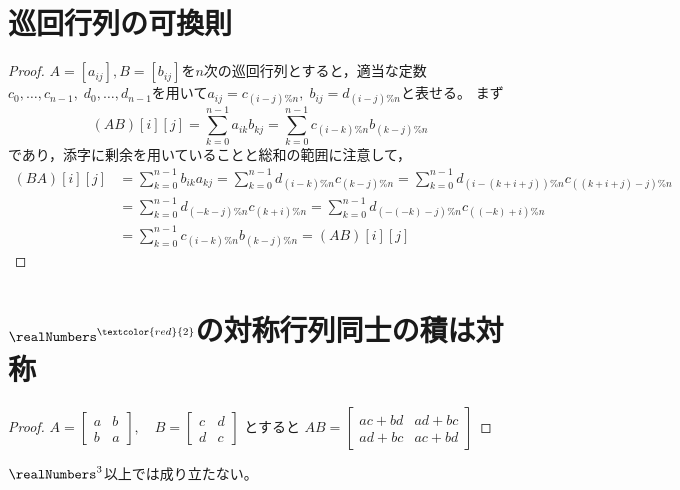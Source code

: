     \section{巡回行列の可換則}
        \begin{proof}
            \quad\par
            $A=[a_{ij}],B=[b_{ij}]$を$n$次の巡回行列とすると，適当な定数$c_0,\dotsc,c_{n-1},\;d_0,\dotsc,d_{n-1}$を用いて$a_{ij} = c_{(i-j)\%n},\;b_{ij} = d_{(i-j)\%n}$と表せる。
            まず
            \[ (AB)[i][j] = \sum_{k=0}^{n-1} a_{ik}b_{kj} = \sum_{k=0}^{n-1} c_{(i-k)\%n}b_{(k-j)\%n} \]
            であり，添字に剰余を用いていることと総和の範囲に注意して，
            \begin{align*}
                (BA)[i][j] &= \sum_{k=0}^{n-1} b_{ik}a_{kj} = \sum_{k=0}^{n-1} d_{(i-k)\%n}c_{(k-j)\%n} = \sum_{k=0}^{n-1} d_{(i-(k+i+j))\%n}c_{((k+i+j)-j)\%n} \\
                &= \sum_{k=0}^{n-1} d_{(-k-j)\%n}c_{(k+i)\%n} = \sum_{k=0}^{n-1} d_{(-(-k)-j)\%n}c_{((-k)+i)\%n} \\
                &= \sum_{k=0}^{n-1} c_{(i-k)\%n}b_{(k-j)\%n} = (AB)[i][j]
            \end{align*}
        \end{proof}
    \section{\texorpdfstring{$\realNumbers^{\textcolor{red}{2}}$}{R\string^2}の対称行列同士の積は対称}
        \begin{proof}
            $
                A = \begin{bmatrix}
                    a & b \\
                    b & a
                \end{bmatrix},\quad
                B = \begin{bmatrix}
                    c & d \\
                    d & c
                \end{bmatrix}
            $
            とすると
            $
                AB = \begin{bmatrix}
                    ac + bd & ad + bc \\
                    ad + bc & ac + bd
                \end{bmatrix}
            $
        \end{proof}
        \begin{attention}
            $\realNumbers^3$以上では成り立たない。
        \end{attention}
